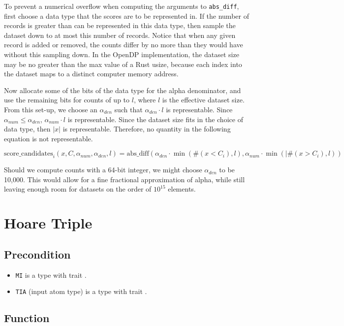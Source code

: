 \documentclass{article}
\begin{document}
To prevent a numerical overflow when computing the arguments to \texttt{abs\_diff}, 
first choose a data type that the scores are to be represented in.
If the number of records is greater than can be represented in this data type, 
then sample the dataset down to at most this number of records.
Notice that when any given record is added or removed, 
the counts differ by no more than they would have without this sampling down.
In the OpenDP implementation, the dataset size may be no greater than the max value of a Rust usize, 
because each index into the dataset maps to a distinct computer memory address.

Now allocate some of the bits of the data type for the alpha denominator,
and use the remaining bits for counts of up to $l$, where $l$ is the effective dataset size.
From this set-up, we choose an $\alpha_{den}$ such that $\alpha_{den} \cdot l$ is representable.
Since $\alpha_{num} \le \alpha_{den}$, $\alpha_{num} \cdot l$ is representable.
Since the dataset size fits in the choice of data type, then $|x|$ is representable.
Therefore, no quantity in the following equation is not representable.

\begin{equation}
    \textrm{score\_candidates}_i(x, C, \alpha_{num}, \alpha_{den}, l) = \mathrm{abs\_diff}(\alpha_{den} \cdot \min(\#(x < C_i), l), \alpha_{num} \cdot \min(|\#(x > C_i), l))
\end{equation}

Should we compute counts with a 64-bit integer, we might choose $\alpha_{den}$ to be 10,000.
This would allow for a fine fractional approximation of alpha,
while still leaving enough room for datasets on the order of $10^{15}$ elements.

\section{Hoare Triple}
\subsection*{Precondition}
\begin{itemize}
    \item \texttt{MI} is a type with trait .
    \item \texttt{TIA} (input atom type) is a type with trait .
\end{itemize}

\subsection*{Function}
\label{sec:python-pseudocode}

\end{document}
